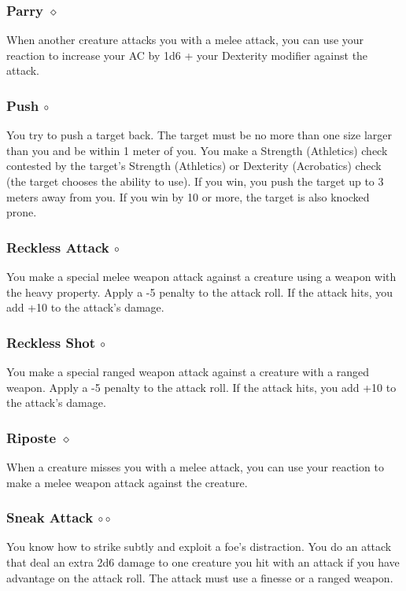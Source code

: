     \subsubsection{Parry $\diamond$} \label{act::parry}
    When another creature attacks you with a melee attack, you can use your reaction to increase your AC by 1d6 + your Dexterity modifier against the attack.
    \subsubsection{Push $\circ$} \label{act::push}
    You try to push a target back.
    The target must be no more than one size larger than you and be within 1 meter of you.
    You make a Strength (Athletics) check contested by the target's Strength (Athletics) or Dexterity (Acrobatics) check (the target chooses the ability to use).
    If you win, you push the target up to 3 meters away from you.
    If you win by 10 or more, the target is also knocked prone.
    \subsubsection{Reckless Attack $\circ$} \label{act::recklessattack}
    You make a special melee weapon attack against a creature using a weapon with the heavy property.
    Apply a -5 penalty to the attack roll.
    If the attack hits, you add +10 to the attack's damage.
    \subsubsection{Reckless Shot $\circ$} \label{act::recklessshot}
    You make a special ranged weapon attack against a creature with a ranged weapon.
    Apply a -5 penalty to the attack roll.
    If the attack hits, you add +10 to the attack's damage.
    \subsubsection{Riposte $\diamond$} \label{act::riposte}
    When a creature misses you with a melee attack, you can use your reaction to make a melee weapon attack against the creature.
    \subsubsection{Sneak Attack $\circ\circ$} \label{act::sneakattack}
    You know how to strike subtly and exploit a foe's distraction.
    You do an attack that deal an extra 2d6 damage to one creature you hit with an attack if you have advantage on the attack roll.
    The attack must use a finesse or a ranged weapon.

